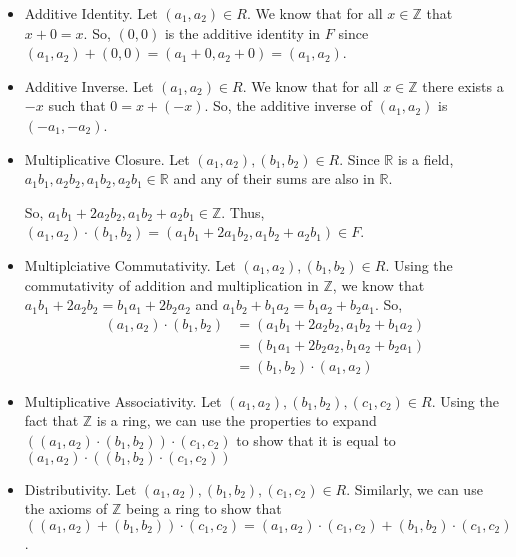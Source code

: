 \documentclass[12pt]{article}
\begin{document}
\begin{enumerate}[start=1,label={\bfseries Problem \arabic*:},leftmargin=1in]
\begin{enumerate}
\begin{itemize}
            \item Additive Identity. Let $(a_{1}, a_{2}) \in R$. We know that for all $x\in\mathbb{Z}$ that $x + 0 = x$. 
            So, $(0, 0)$ is the additive identity in $F$ since $(a_{1}, a_{2}) + (0, 0) = (a_{1} + 0, a_{2} + 0) = (a_{1}, a_{2})$. 

            \item Additive Inverse. Let $(a_{1}, a_{2}) \in R$. We know that for all $x \in \mathbb{Z}$ there exists a $-x$ such that $0 = x + (-x)$. 
            So, the additive inverse of $(a_{1}, a_{2})$ is $(-a_{1}, -a_{2})$. 

            \item Multiplicative Closure. Let $(a_{1}, a_{2}), (b_{1}, b_{2}) \in R$. Since $\mathbb{R}$ is a field, $a_{1}b_{1}, a_{2}b_{2}, a_{1}b_{2}, a_{2}b_{1} \in \mathbb{R}$ 
            and any of their sums are also in $\mathbb{R}$. 

            So, $a_{1}b_{1} + 2a_{2}b_{2}, a_{1}b_{2} + a_{2}b_{1} \in \mathbb{Z}$. Thus, 
            $(a_{1}, a_{2}) \cdot (b_{1}, b_{2}) = (a_{1}b_{1} + 2a_{1}b_{2}, a_{1}b_{2} + a_{2}b_{1}) \in F$. 
        
            \item Multiplciative Commutativity. Let $(a_{1}, a_{2}), (b_{1}, b_{2}) \in R$. Using the commutativity of addition and multiplication in $\mathbb{Z}$, we know that 
            $a_{1}b_{1} + 2a_{2}b_{2} = b_{1}a_{1} + 2b_{2}a_{2}$ and $a_{1}b_{2} + b_{1}a_{2} = b_{1}a_{2} + b_{2}a_{1}$. So, 
            \begin{align*}
                (a_{1}, a_{2}) \cdot (b_{1}, b_{2}) &= (a_{1}b_{1} + 2a_{2}b_{2}, a_{1}b_{2} + b_{1}a_{2}) \\ 
                &= (b_{1}a_{1} + 2b_{2}a_{2}, b_{1}a_{2} + b_{2}a_{1}) \\ 
                &= (b_{1}, b_{2}) \cdot (a_{1}, a_{2})
            \end{align*} 
                
            \item Multiplicative Associativity. Let $(a_{1}, a_{2}), (b_{1}, b_{2}), (c_{1}, c_{2}) \in R$. 
            Using the fact that $\mathbb{Z}$ is a ring, we can use the properties to expand $((a_{1}, a_{2}) \cdot (b_{1}, b_{2})) \cdot (c_{1}, c_{2})$ to show that it is equal to $ (a_{1}, a_{2}) \cdot ((b_{1}, b_{2}) \cdot (c_{1}, c_{2}))$

            \item Distributivity. Let $(a_{1}, a_{2}), (b_{1}, b_{2}), (c_{1}, c_{2}) \in R$. 
            Similarly, we can use the axioms of $\mathbb{Z}$ being a ring to show that $((a_{1}, a_{2}) + (b_{1}, b_{2})) \cdot (c_{1}, c_{2}) = (a_{1}, a_{2}) \cdot (c_{1}, c_{2}) + (b_{1}, b_{2}) \cdot (c_{1}, c_{2})$. 
        \end{itemize}


\end{enumerate}
\end{enumerate}
\end{document}
